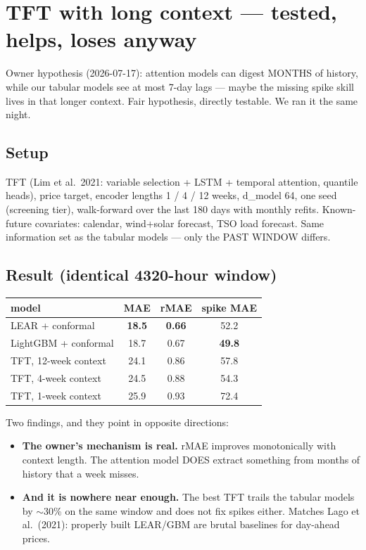 \section{TFT with long context --- tested, helps, loses anyway}

Owner hypothesis (2026-07-17): attention models can digest MONTHS of
history, while our tabular models see at most 7-day lags --- maybe the
missing spike skill lives in that longer context. Fair hypothesis,
directly testable. We ran it the same night.

\subsection{Setup}

TFT (Lim et al.\ 2021: variable selection + LSTM + temporal attention,
quantile heads), price target, encoder lengths 1 / 4 / 12 weeks,
d\_model 64, one seed (screening tier), walk-forward over the last 180
days with monthly refits. Known-future covariates: calendar, wind+solar
forecast, TSO load forecast. Same information set as the tabular
models --- only the PAST WINDOW differs.

\subsection{Result (identical 4320-hour window)}

\begin{center}
\begin{tabular}{lccc}
model & MAE & rMAE & spike MAE \\
\hline
LEAR + conformal & \textbf{18.5} & \textbf{0.66} & 52.2 \\
LightGBM + conformal & 18.7 & 0.67 & \textbf{49.8} \\
TFT, 12-week context & 24.1 & 0.86 & 57.8 \\
TFT, 4-week context & 24.5 & 0.88 & 54.3 \\
TFT, 1-week context & 25.9 & 0.93 & 72.4 \\
\end{tabular}
\end{center}

Two findings, and they point in opposite directions:

\begin{itemize}
  \item \textbf{The owner's mechanism is real.} rMAE improves
        monotonically with context length. The attention model DOES
        extract something from months of history that a week misses.
  \item \textbf{And it is nowhere near enough.} The best TFT trails the
        tabular models by $\sim$30\% on the same window and does not
        fix spikes either. Matches Lago et al.\ (2021): properly built
        LEAR/GBM are brutal baselines for day-ahead prices.
\end{itemize}

